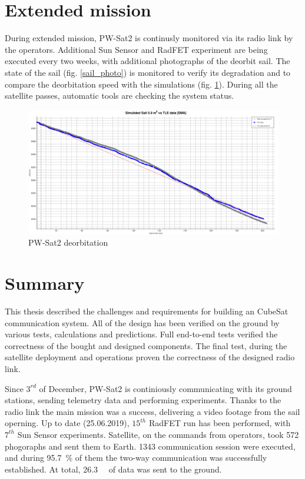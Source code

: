 \section{Extended mission}
During extended mission, PW-Sat2 is continusly monitored via its radio link by the operators. Additional Sun Sensor and RadFET experiment are being executed every two weeks, with additional photographs of the deorbit sail. The state of the sail (fig. \ref{sail_photo}) is monitored to verify its degradation and to compare the deorbitation speed with the simulations (fig. \ref{deorbitation}). During all the satellite passes, automatic tools are checking the system status.

\begin{figure}[H]
    \centering
    \includegraphics[width=0.65\paperwidth]{img/9/deorbitation.png}
    \caption{PW-Sat2 deorbitation}
    \label{deorbitation}
\end{figure}

\section{Summary}
This thesis described the challenges and requirements for building an CubeSat communication system. All of the design has been verified on the ground by various tests, calculations and predictions. Full end-to-end tests verified the correctness of the bought and designed components. The final test, during the satellite deployment and operations proven the correctness of the designed radio link.

Since $3^{rd}$ of December, PW-Sat2 is continiously communicating with its ground stations, sending telemetry data and performing experiments. Thanks to the radio link the main mission was a success, delivering a video footage from the sail operning. Up to date (25.06.2019), $15^{th}$ RadFET run has been performed, with $7^{th}$ Sun Sensor experiments. Satellite, on the commands from operators, took \si{572} phogoraphs and sent them to Earth. \si{1343} communication session were executed, and during \SI{95.7}{\percent} of them the two-way communication was successfully established. At total, \SI{26.3}{\mega\byte} of data was sent to the ground.

